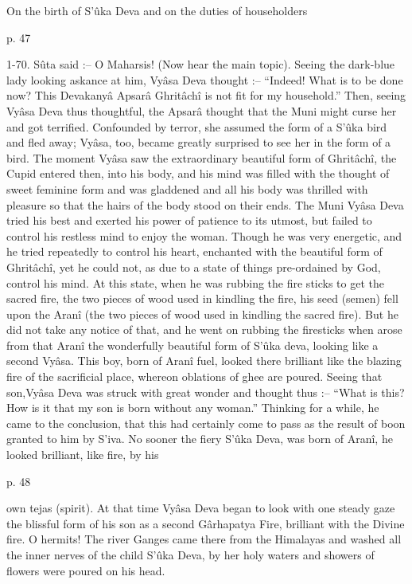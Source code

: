 On the birth of S’ûka Deva and on the duties of householders

 

p. 47

 

1-70. Sûta said :-- O Maharsis! (Now hear the main topic). Seeing the dark-blue lady looking askance at him, Vyâsa Deva thought :-- “Indeed! What is to be done now? This Devakanyâ Apsarâ Ghritâchî is not fit for my household.” Then, seeing Vyâsa Deva thus thoughtful, the Apsarâ thought that the Muni might curse her and got terrified. Confounded by terror, she assumed the form of a S’ûka bird and fled away; Vyâsa, too, became greatly surprised to see her in the form of a bird. The moment Vyâsa saw the extraordinary beautiful form of Ghritâchî, the Cupid entered then, into his body, and his mind was filled with the thought of sweet feminine form and was gladdened and all his body was thrilled with pleasure so that the hairs of the body stood on their ends. The Muni Vyâsa Deva tried his best and exerted his power of patience to its utmost, but failed to control his restless mind to enjoy the woman. Though he was very energetic, and he tried repeatedly to control his heart, enchanted with the beautiful form of Ghritâchî, yet he could not, as due to a state of things pre-ordained by God, control his mind. At this state, when he was rubbing the fire sticks to get the sacred fire, the two pieces of wood used in kindling the fire, his seed (semen) fell upon the Aranî (the two pieces of wood used in kindling the sacred fire). But he did not take any notice of that, and he went on rubbing the firesticks when arose from that Aranî the wonderfully beautiful form of S’ûka deva, looking like a second Vyâsa. This boy, born of Aranî fuel, looked there brilliant like the blazing fire of the sacrificial place, whereon oblations of ghee are poured. Seeing that son,Vyâsa Deva was struck with great wonder and thought thus :-- “What is this? How is it that my son is born without any woman.” Thinking for a while, he came to the conclusion, that this had certainly come to pass as the result of boon granted to him by S'iva. No sooner the fiery S’ûka Deva, was born of Aranî, he looked brilliant, like fire, by his

 

p. 48

 

own tejas (spirit). At that time Vyâsa Deva began to look with one steady gaze the blissful form of his son as a second Gârhapatya Fire, brilliant with the Divine fire. O hermits! The river Ganges came there from the Himalayas and washed all the inner nerves of the child S’ûka Deva, by her holy waters and showers of flowers were poured on his head.

